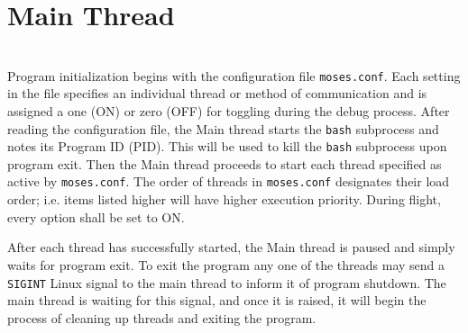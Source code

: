 %
\section{Main Thread}
\hrulefill
\\
Program initialization begins with the configuration file \texttt{moses.conf}. Each setting in the file specifies an individual thread or method of communication and is assigned a one (ON) or zero (OFF) for toggling during the debug process. After reading the configuration file, the Main thread starts the \texttt{bash} subprocess and notes its Program ID (PID). This will be used to kill the \texttt{bash} subprocess upon program exit. Then the Main thread proceeds to start each thread specified as active by \texttt{moses.conf}. The order of threads in \texttt{moses.conf} designates their load order; i.e. items listed higher will have higher execution priority. During flight, every option shall be set to ON. 

After each thread has successfully started, the Main thread is paused and simply waits for program exit. To exit the program any one of the threads may send a \texttt{SIGINT} Linux signal to the main thread to inform it of program shutdown. The main thread is waiting for this signal, and once it is raised, it will begin the process of cleaning up threads and exiting the program.